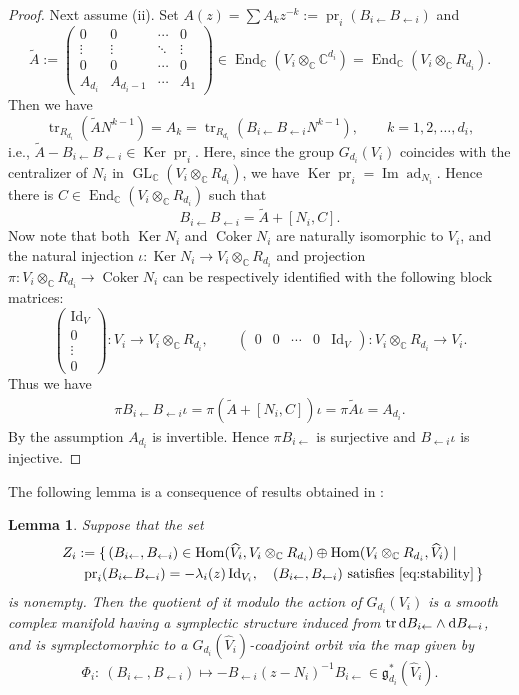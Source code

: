 \documentclass[11pt]{article}
\newcommand{\shortleftarrow}{\leftarrow}
\newcommand{\slar}{\shortleftarrow}
\numberwithin{equation}{section}
\newtheorem{Lemma}[Theorem]{Lemma}
\theoremstyle{definition}
\newcommand{\C}{\mathbb{C}} %
\newcommand{\GL}{\operatorname{GL}} %
\newcommand{\g}{\mathfrak{g}} %
\newcommand{\ad}{\operatorname{ad}}
\newcommand{\End}{\operatorname{End}}
\newcommand{\Hom}{\operatorname{Hom}}
\newcommand{\Ker}{\operatorname{Ker}}
\newcommand{\range}{\operatorname{Im}}
\newcommand{\Coker}{\operatorname{Coker}}
\newcommand{\tr}{\operatorname{tr}}
\newcommand{\unit}{\mathrm{Id}}
\newcommand{\prj}{\operatorname{pr}}
\newcommand{\rd}{\mathop{\mathrm{d}\!}\mathstrut}
\begin{document}
\begin{proof}
Next assume (ii).
Set $A(z)=\sum A_k z^{-k}:=\prj_i(B_{i \slar}B_{\slar i})$ and
\[
\widetilde{A} :=
\begin{pmatrix}
0 & 0 & \cdots & 0 \\
\vdots & \vdots & \ddots & \vdots \\
0 & 0 & \cdots & 0 \\
A_{d_i} & A_{d_i-1} & \cdots & A_1
\end{pmatrix}
\in \End_\C(V_i \otimes_\C \C^{d_i})=\End_\C(V_i \otimes_\C R_{d_i}).
\]
Then we have
\[
\tr_{R_{d_i}}(\widetilde{A}N^{k-1}) = A_k
= \tr_{R_{d_i}}(B_{i \slar}  B_{\slar i}N^{k-1}),
\qquad k=1,2,\dots ,d_i,
\]
i.e., $\widetilde{A}-B_{i \slar}B_{\slar i} \in \Ker \prj_i$.
Here, since the group $G_{d_i}(V_i)$ coincides with the centralizer of $N_i$
in $\GL_\C(V_i \otimes_\C R_{d_i})$, we have $\Ker \prj_i = \range \ad_{N_i}$.
Hence there is $C \in \End_\C(V_i \otimes_\C R_{d_i})$ such that
\[
B_{i \slar}  B_{\slar i} = \widetilde{A} + [N_i,C].
\]
Now note that both $\Ker N_i$ and $\Coker N_i$ are naturally isomorphic to $V_i$,
and the natural injection $\iota \colon \Ker N_i \to V_i \otimes_\C R_{d_i}$ and
projection $\pi \colon V_i \otimes_\C R_{d_i} \to \Coker N_i$
can be respectively identif\/ied with
the following block matrices:
\[
\begin{pmatrix} \unit_V \\ 0 \\ \vdots \\ 0
\end{pmatrix} \colon V_i \to V_i \otimes_\C R_{d_i}, \qquad
\begin{pmatrix}
0 & 0 & \cdots & 0 & \unit_V
\end{pmatrix} \colon V_i \otimes_\C R_{d_i} \to V_i.
\]
Thus we have
\begin{gather}\label{eq:momentrel}
\pi B_{i \slar}  B_{\slar i} \iota =
\pi (\widetilde{A} + [N_i,C]) \iota =
\pi \widetilde{A} \iota = A_{d_i}.
\end{gather}
By the assumption $A_{d_i}$ is invertible.
Hence $\pi B_{i \slar}$ is surjective and $B_{\slar i} \iota$ is injective.
\end{proof}


The following lemma is a consequence of results obtained in
\cite{0911.3863}:
\begin{Lemma}\label{lem:orbit1}
Suppose that the set
\begin{gather*}
Z_i :=
\{\, (B_{i \slar},B_{\slar i}) \in \Hom(\widehat{V}_i,V_i\otimes_\C R_{d_i})
\oplus \Hom(V_i\otimes_\C R_{d_i},\widehat{V}_i) \mid \\
\phantom{Z_i := \{\, }{} \prj_i(B_{i \slar}B_{\slar i})=-\lambda_i(z)\,\unit_{V_i},\quad
\text{\rm $(B_{i \slar}, B_{\slar i})$
satisfies \eqref{eq:stability}}
\,\}
\end{gather*}
is nonempty.
Then the quotient of it modulo the action of $G_{d_i}(V_i)$
is a smooth complex manifold having a
symplectic structure induced from
$\tr \rd B_{i \slar} \wedge \rd B_{\slar i}$,
and is symplectomorphic to
a $G_{d_i}(\widehat{V}_i)$-coadjoint orbit via the map given by
\[
\Phi_i \colon \ (B_{i \slar},B_{\slar i}) \longmapsto
- B_{\slar i}(z-N_i)^{-1}B_{i \slar} \in \g^*_{d_i}(\widehat{V}_i).
\]
\end{Lemma}
\end{document}
